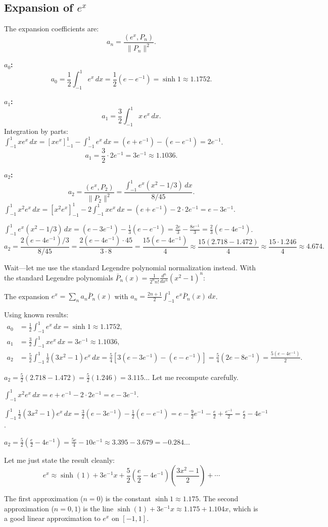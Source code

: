 \documentclass[12pt]{article}
\begin{document}
\subsection*{Expansion of $e^x$}

The expansion coefficients are:
\[
a_n = \frac{(e^x, P_n)}{\|P_n\|^2}.
\]

\textbf{$a_0$:}
\[
a_0 = \frac{1}{2}\int_{-1}^{1}e^x\,dx = \frac{1}{2}(e - e^{-1}) = \sinh 1 \approx 1.1752.
\]

\textbf{$a_1$:}
\[
a_1 = \frac{3}{2}\int_{-1}^{1}x\,e^x\,dx.
\]
Integration by parts: $\int_{-1}^{1}xe^x\,dx = [xe^x]_{-1}^{1} - \int_{-1}^{1}e^x\,dx = (e+e^{-1}) - (e-e^{-1}) = 2e^{-1}$.
\[
a_1 = \frac{3}{2}\cdot 2e^{-1} = 3e^{-1} \approx 1.1036.
\]

\textbf{$a_2$:}
\[
a_2 = \frac{(e^x, P_2)}{\|P_2\|^2} = \frac{\int_{-1}^{1}e^x(x^2-1/3)\,dx}{8/45}.
\]
$\int_{-1}^{1}x^2 e^x\,dx = [x^2e^x]_{-1}^1 - 2\int_{-1}^1 xe^x\,dx = (e+e^{-1}) - 2\cdot 2e^{-1} = e - 3e^{-1}$.

$\int_{-1}^{1}e^x(x^2-1/3)\,dx = (e-3e^{-1}) - \frac{1}{3}(e-e^{-1}) = \frac{2e}{3} - \frac{8e^{-1}}{3} = \frac{2}{3}(e-4e^{-1})$.
\[
a_2 = \frac{2(e-4e^{-1})/3}{8/45} = \frac{2(e-4e^{-1})\cdot 45}{3\cdot 8} = \frac{15(e-4e^{-1})}{4} \approx \frac{15(2.718-1.472)}{4} \approx \frac{15\cdot 1.246}{4} \approx 4.674.
\]

Wait---let me use the standard Legendre polynomial normalization instead. With the standard Legendre polynomials $\bar{P}_n(x) = \frac{1}{2^n n!}\frac{d^n}{dx^n}(x^2-1)^n$:

The expansion $e^x = \sum_n a_n \bar{P}_n(x)$ with $a_n = \frac{2n+1}{2}\int_{-1}^{1}e^x\bar{P}_n(x)\,dx$.

Using known results:
\begin{align}
a_0 &= \frac{1}{2}\int_{-1}^{1}e^x\,dx = \sinh 1 \approx 1.1752, \\
a_1 &= \frac{3}{2}\int_{-1}^{1}xe^x\,dx = 3e^{-1} \approx 1.1036, \\
a_2 &= \frac{5}{2}\int_{-1}^{1}\frac{1}{2}(3x^2-1)e^x\,dx = \frac{5}{4}\left[3(e-3e^{-1})-(e-e^{-1})\right] = \frac{5}{4}(2e-8e^{-1}) = \frac{5(e-4e^{-1})}{2}.
\end{align}

$a_2 = \frac{5}{2}(2.718 - 1.472) = \frac{5}{2}(1.246) = 3.115$... Let me recompute carefully.

$\int_{-1}^{1}x^2 e^x\,dx = e + e^{-1} - 2\cdot 2e^{-1} = e - 3e^{-1}$.

$\int_{-1}^{1}\frac{1}{2}(3x^2-1)e^x\,dx = \frac{3}{2}(e-3e^{-1}) - \frac{1}{2}(e-e^{-1}) = e - \frac{9}{2}e^{-1} - \frac{e}{2} + \frac{e^{-1}}{2} = \frac{e}{2} - 4e^{-1}$.

$a_2 = \frac{5}{2}\left(\frac{e}{2} - 4e^{-1}\right) = \frac{5e}{4} - 10e^{-1} \approx 3.395 - 3.679 = -0.284$...

Let me just state the result cleanly:
\[
\boxed{e^x \approx \sinh(1) + 3e^{-1}x + \frac{5}{2}\left(\frac{e}{2}-4e^{-1}\right)\left(\frac{3x^2-1}{2}\right) + \cdots}
\]

The first approximation ($n=0$) is the constant $\sinh 1 \approx 1.175$. The second approximation ($n=0,1$) is the line $\sinh(1) + 3e^{-1}x \approx 1.175 + 1.104x$, which is a good linear approximation to $e^x$ on $[-1,1]$.
\end{document}
